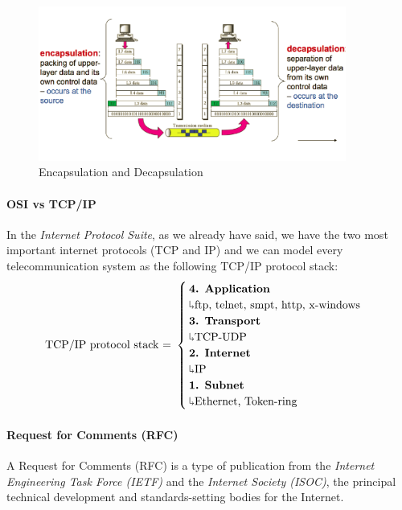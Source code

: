 \begin{figure}
\centering \includegraphics[width=0.9\textwidth]{ENCAPandDECAP.png}
\caption{\label{ENCAPandDECAP.png} Encapsulation and Decapsulation}
\end{figure}

\paragraph{OSI vs TCP/IP}
In the \textit{Internet Protocol Suite}, as we already have said, we have the two most important internet protocols (TCP and IP) and we can model every telecommunication system as the following TCP/IP protocol stack:
\begin{equation}\text{TCP/IP protocol stack = }
\begin{cases}
\text{\textbf{4. Application}} \\\rotatebox[origin=c]{180}{$\Lsh$} \text{ftp, telnet, smpt, http, x-windows}\\
\text{\textbf{3. Transport}} \\\rotatebox[origin=c]{180}{$\Lsh$} \text{TCP-UDP}\\
\text{\textbf{2. Internet}} \\\rotatebox[origin=c]{180}{$\Lsh$} \text{IP}\\
\text{\textbf{1. Subnet}} \\\rotatebox[origin=c]{180}{$\Lsh$} \text{Ethernet, Token-ring}
\end{cases}
\end{equation}

\paragraph{Request for Comments (RFC)}
A Request for Comments (RFC) is a type of publication from the \textit{Internet Engineering Task Force (IETF)} and the \textit{Internet Society (ISOC)}, the principal technical development and standards-setting bodies for the Internet. 

